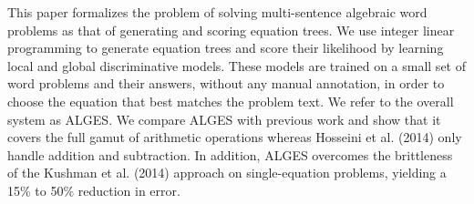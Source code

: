 This paper formalizes the problem of solving multi-sentence algebraic word problems as that of generating and scoring equation trees. We use integer linear programming to generate equation trees and score their likelihood by learning local and global discriminative models. These models are trained on a small set of word problems and their answers, without any manual annotation, in order to choose the equation that best matches the problem text. We refer to the overall system as ALGES. We compare ALGES with previous work and show that it covers the full gamut of arithmetic operations whereas Hosseini et al. (2014) only handle addition and subtraction. In addition, ALGES overcomes the brittleness of the Kushman et al. (2014) approach on single-equation problems, yielding a 15\% to 50\% reduction in error.
